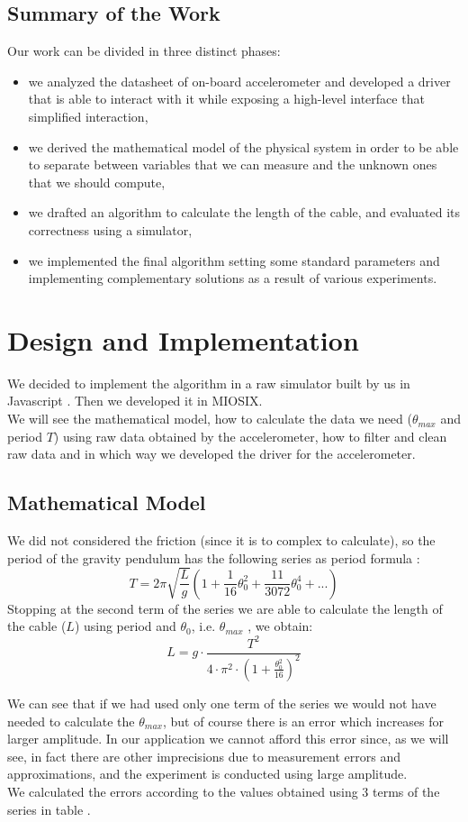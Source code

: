 \subsection{Summary of the Work}
Our work can be divided in three distinct phases:
\begin{itemize}
	\item we analyzed the datasheet \cite{accelerometerDatasheet} of on-board accelerometer and developed a driver that is able to interact with it while exposing a high-level interface that simplified interaction,
	\item we derived the mathematical model of the physical system in order to be able to separate between variables that we can measure and the unknown ones that we should compute,
	\item we drafted an algorithm to calculate the length of the cable, and evaluated its correctness using a simulator,
	\item we implemented the final algorithm setting some standard parameters and implementing complementary solutions as a result of various experiments. 
\end{itemize}
\pagebreak

\section{Design and Implementation}
We decided to implement the algorithm in a raw simulator built by us in Javascript \cite{javascriptPrototype}. Then we developed it in MIOSIX.\\
We will see the mathematical model, how to calculate the data we need ($\theta_{max}$ and period $T$) using raw data obtained by the accelerometer, how to filter and clean raw data and in which way we developed the driver for the accelerometer.

\subsection{Mathematical Model}
\label{sec:mathmodel}
We did not considered the friction (since it is to complex to calculate), so the period of the gravity pendulum has the following series as period formula \cite{pendulumSeries}: 
$$T = 2 \pi \sqrt{\frac{L}{g}} \left(1 + \frac{1}{16} \theta_0^2 + \frac{11}{3072} \theta_0^4 + ...\right)$$
Stopping at the second term of the series we are able to calculate the length of the cable ($L$) using period and $\theta_0$, i.e. $\theta_{max}$ , we obtain:
$$ L = g \cdot \frac{T^2}{4 \cdot \pi^2 \cdot \left(1 + \frac{\theta_0^2}{16}\right)^2}$$
\par
We can see that if we had used only one term of the series we would not have needed to calculate the $\theta_{max}$, but of course there is an error which increases for larger amplitude. In our application we cannot afford this error since, as we will see, in fact there are other imprecisions due to measurement errors and approximations, and the experiment is conducted using large amplitude.\\
We calculated the errors according to the values obtained using 3 terms of the series in table .  

